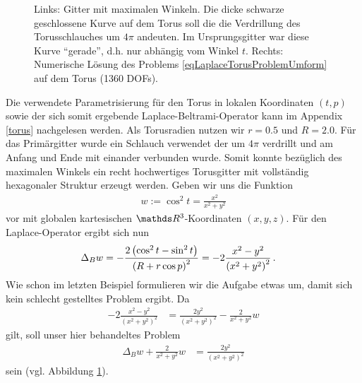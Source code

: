 \begin{figure}
\begin{minipage}[t]{0.49\textwidth}
      \end{minipage}
      \caption[Laplace auf Torus]{Links: Gitter mit maximalen Winkeln.
                                         Die dicke schwarze geschlossene Kurve auf dem Torus soll die die Verdrillung des Torusschlauches um \( 4\pi \) andeuten.
                                         Im Ursprungsgitter war diese Kurve "`gerade"', d.h. nur abhängig vom Winkel \( t \).
                                  Rechts: Numerische Lösung des Problems \eqref{eqLaplaceTorusProblemUmform} auf dem Torus (1360 DOFs).}
      \label{figLaplaceTorus}
    \end{figure}

    \begin{beispiel}[Torus]
      Die verwendete Parametrisierung für den Torus in lokalen Koordinaten \( (t,p) \) sowie der sich somit ergebende
      Laplace-Beltrami-Operator kann im Appendix \ref{torus} nachgelesen werden.
      Als Torusradien nutzen wir \( r=0.5 \) und \( R=2.0 \).
      Für das Primärgitter wurde ein Schlauch verwendet der um \( 4\pi \) verdrillt und am Anfang und Ende
      mit einander verbunden wurde.
      Somit konnte bezüglich des maximalen Winkels ein recht hochwertiges Torusgitter mit vollständig
      hexagonaler Struktur erzeugt werden.      
      Geben wir uns die Funktion
      \begin{align}
        w := \cos^{2} t = \frac{x^{2}}{x^{2}+y^{2}}
      \end{align}
      vor mit globalen kartesischen \( \R^{3} \)-Koordinaten \( (x,y,z) \).
      Für den Laplace-Operator ergibt sich nun
      \begin{align}
        \Delta_{B} w &= -\frac{2 \left( \cos^{2} t - \sin^{2} t \right)}{\left( R + r\cos p \right)^{2}} 
                      = -2 \frac{x^{2} - y^{2}}{\left( x^{2} + y^{2} \right)^{2}} \,\text{.}
      \end{align}
      Wie schon im letzten Beispiel formulieren wir die Aufgabe etwas um, damit sich kein schlecht gestelltes
      Problem ergibt.
      Da
      \begin{align}
        -2 \frac{x^{2} - y^{2}}{\left( x^{2} + y^{2} \right)^{2}}
            &= \frac{2 y^{2}}{\left( x^{2} + y^{2} \right)^{2}} - \frac{2}{x^{2}+y^{2}} w
      \end{align}
      gilt, soll unser hier behandeltes Problem
      \begin{align}
        \label{eqLaplaceTorusProblemUmform}
        \Delta_{B} w + \frac{2}{x^{2}+y^{2}} w &= \frac{2 y^{2}}{\left( x^{2} + y^{2} \right)^{2}}
      \end{align}
      sein (vgl. Abbildung \ref{figLaplaceTorus}).
      

\end{beispiel}
